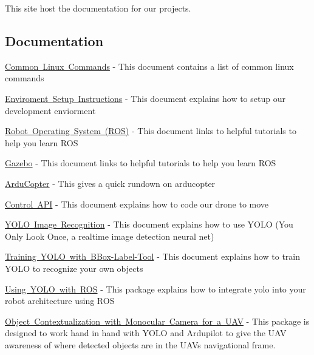 This site host the documentation for our projects.

\subsection*{Documentation}

\mbox{\hyperlink{md_linux_commands}{Common Linux Commands}} -\/ This document contains a list of common linux commands

\mbox{\hyperlink{md_enviorment_setup}{Enviroment Setup Instructions}} -\/ This document explains how to setup our development enviorment

\mbox{\hyperlink{md_basic_ros}{Robot Operating System (R\+OS)}} -\/ This document links to helpful tutorials to help you learn R\+OS

\mbox{\hyperlink{md_basic_gazebo}{Gazebo}} -\/ This document links to helpful tutorials to help you learn R\+OS

\mbox{\hyperlink{md_arducopter}{Ardu\+Copter}} -\/ This gives a quick rundown on arducopter

\mbox{\hyperlink{md_control_api_tutorial}{Control A\+PI}} -\/ This document explains how to code our drone to move

\mbox{\hyperlink{md_yolo}{Y\+O\+LO Image Recognition}} -\/ This document explains how to use Y\+O\+LO (You Only Look Once, a realtime image detection neural net)

\mbox{\hyperlink{md_yoloTraining}{Training Y\+O\+LO with B\+Box-\/\+Label-\/\+Tool}} -\/ This document explains how to train Y\+O\+LO to recognize your own objects

\mbox{\hyperlink{md_yolo_ros}{Using Y\+O\+LO with R\+OS}} -\/ This package explains how to integrate yolo into your robot architecture using R\+OS

\mbox{\hyperlink{md_monocular_uav}{Object Contextualization with Monocular Camera for a U\+AV}} -\/ This package is designed to work hand in hand with Y\+O\+LO and Ardupilot to give the U\+AV awareness of where detected objects are in the U\+AV\textquotesingle{}s navigational frame. 